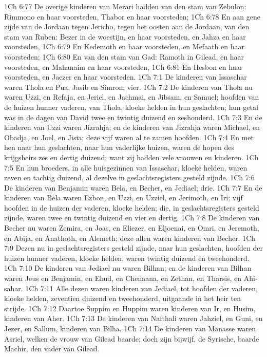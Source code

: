 1Ch 6:77  De overige kinderen van Merari hadden van den stam van Zebulon: Rimmono en haar voorsteden, Thabor en haar voorsteden;
1Ch 6:78  En aan gene zijde van de Jordaan tegen Jericho, tegen het oosten aan de Jordaan, van den stam van Ruben: Bezer in de woestijn, en haar voorsteden, en Jahza en haar voorsteden,
1Ch 6:79  En Kedemoth en haar voorsteden, en Mefaath en haar voorsteden;
1Ch 6:80  En van den stam van Gad: Ramoth in Gilead, en haar voorsteden, en Mahanaim en haar voorsteden,
1Ch 6:81  En Hesbon en haar voorsteden, en Jaezer en haar voorsteden.
1Ch 7:1  De kinderen van Issaschar waren Thola en Pua, Jasib en Simron; vier.
1Ch 7:2  De kinderen van Thola nu waren Uzzi, en Refaja, en Jeriel, en Jachmai, en Jibsam, en Samuel; hoofden van de huizen hunner vaderen, van Thola, kloeke helden in hun geslachten; hun getal was in de dagen van David twee en twintig duizend en zeshonderd.
1Ch 7:3  En de kinderen van Uzzi waren Jizrahja; en de kinderen van Jizrahja waren Michael, en Obadja, en Joel, en Jisia; deze vijf waren al te zamen hoofden.
1Ch 7:4  En met hen naar hun geslachten, naar hun vaderlijke huizen, waren de hopen des krijgsheirs zes en dertig duizend; want zij hadden vele vrouwen en kinderen.
1Ch 7:5  En hun broeders, in alle huisgezinnen van Issaschar, kloeke helden, waren zeven en tachtig duizend, al dezelve in geslachtsregisters gesteld zijnde.
1Ch 7:6  De kinderen van Benjamin waren Bela, en Becher, en Jediael; drie.
1Ch 7:7  En de kinderen van Bela waren Ezbon, en Uzzi, en Uzziel, en Jerimoth, en Iri; vijf hoofden in de huizen der vaderen, kloeke helden; die, in geslachtsregisters gesteld zijnde, waren twee en twintig duizend en vier en dertig.
1Ch 7:8  De kinderen van Becher nu waren Zemira, en Joas, en Eliezer, en Eljoenai, en Omri, en Jeremoth, en Abija, en Anathoth, en Alemeth; deze allen waren kinderen van Becher.
1Ch 7:9  Dezen nu in geslachtsregisters gesteld zijnde, naar hun geslachten, hoofden der huizen hunner vaderen, kloeke helden, waren twintig duizend en tweehonderd.
1Ch 7:10  De kinderen van Jediael nu waren Bilhan; en de kinderen van Bilhan waren Jeus en Benjamin, en Ehud, en Chenaana, en Zethan, en Tharsis, en Ahi-sahar.
1Ch 7:11  Alle dezen waren kinderen van Jediael, tot hoofden der vaderen, kloeke helden, zeventien duizend en tweehonderd, uitgaande in het heir ten strijde.
1Ch 7:12  Daartoe Suppim en Huppim waren kinderen van Ir, en Husim, kinderen van Aher.
1Ch 7:13  De kinderen van Nafthali waren Jahziel, en Guni, en Jezer, en Sallum, kinderen van Bilha.
1Ch 7:14  De kinderen van Manasse waren Asriel, welken de vrouw van Gilead baarde; doch zijn bijwijf, de Syrische, baarde Machir, den vader van Gilead.
